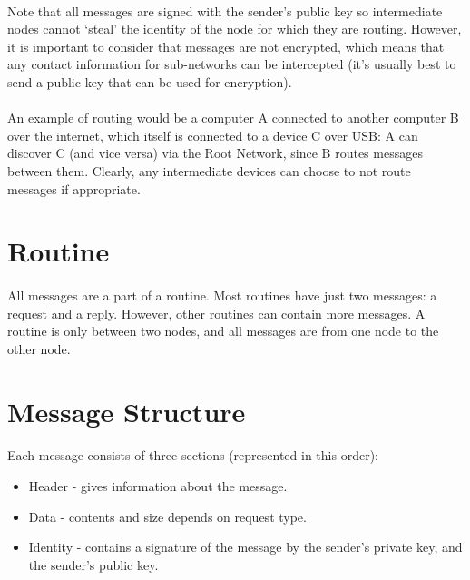 \documentclass{article}
\begin{document}
\paragraph{}
Note that all messages are signed with the sender's public key so intermediate nodes cannot `steal' the identity of the node for which they are routing. However, it is important to consider that messages are not encrypted, which means that any contact information for sub-networks can be intercepted (it's usually best to send a public key that can be used for encryption).

\paragraph{}
An example of routing would be a computer A connected to another computer B over the internet, which itself is connected to a device C over USB: A can discover C (and vice versa) via the Root Network, since B routes messages between them. Clearly, any intermediate devices can choose to not route messages if appropriate.

\section{Routine}

\paragraph{}
All messages are a part of a routine. Most routines have just two messages: a request and a reply. However, other routines can contain more messages. A routine is only between two nodes, and all messages are from one node to the other node.

\section{Message Structure}

\paragraph{}
Each message consists of three sections (represented in this order):

\begin{itemize}
\item Header - gives information about the message.
\item Data - contents and size depends on request type.
\item Identity - contains a signature of the message by the sender's private key, and the sender's public key.
\end{itemize}
\end{document}
